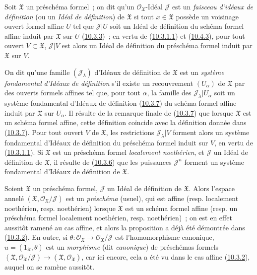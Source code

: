 \begin{env}[10.5.1]
\label{I.10.5.1-fr}
Soit $\mathfrak{X}$ un préschéma formel~; on dit qu'un
$\mathscr{O}_{\mathfrak{X}}$-Idéal $\mathscr{J}$ est un
\emph{faisceau d'idéaux de définition} (ou un
\emph{Idéal de définition}) de $\mathfrak{X}$ si tout
$x\in\mathfrak{X}$ possède un voisinage ouvert formel affine $U$ tel que
$\mathscr{J}|U$ soit un Idéal de définition du schéma formel affine
induit par $\mathfrak{X}$ sur $U$
(\hyperref[I.10.3.3-fr]{10.3.3})~; en vertu de
(\hyperref[I.10.3.1.1-fr]{10.3.1.1}) et
(\hyperref[I.10.4.3-fr]{10.4.3}), pour tout ouvert
$V\subset\mathfrak{X}$, $\mathscr{J}|V$ est alors un Idéal de définition
du préschéma formel induit par $\mathfrak{X}$ sur $V$.

On dit qu'une famille $(\mathscr{J}_\lambda)$ d'Idéaux de définition de
$\mathfrak{X}$ est un \emph{système fondamental}
\emph{d'Idéaux de définition} s'il existe un recouvrement
$(U_\alpha)$ de $\mathfrak{X}$ par des ouverts formels affines tel que,
pour tout $\alpha$, la famille des
$\mathscr{J}_\lambda|U_\alpha$ soit un système fondamental d'Idéaux de
définition (\hyperref[I.10.3.7-fr]{10.3.7}) du schéma formel affine
induit par $\mathfrak{X}$ sur $U_\alpha$. Il résulte de la remarque finale
de (\hyperref[I.10.3.7-fr]{10.3.7}) que lorsque $\mathfrak{X}$ est un
schéma formel affine, cette définition coïncide avec la définition donnée
dans (\hyperref[I.10.3.7-fr]{10.3.7}). Pour tout ouvert $V$ de
$\mathfrak{X}$, les restrictions $\mathscr{J}_\lambda|V$ forment alors un
système fondamental d'Idéaux de définition du préschéma formel induit sur
$V$, en vertu de (\hyperref[I.10.3.1.1-fr]{10.3.1.1}). Si
$\mathfrak{X}$ est un préschéma formel \emph{localement noethérien}, et
$\mathscr{J}$ un Idéal de définition de $\mathfrak{X}$, il résulte de
(\hyperref[I.10.3.6-fr]{10.3.6}) que les puissances $\mathscr{J}^n$
forment un système fondamental d'Idéaux de définition de $\mathfrak{X}$.
\end{env}

\begin{env}[10.5.2]
\label{I.10.5.2-fr}
Soient $\mathfrak{X}$ un préschéma formel, $\mathscr{J}$ un Idéal de
définition de $\mathfrak{X}$. Alors l'espace annelé
$(\mathfrak{X},\mathscr{O}_{\mathfrak{X}}/\mathscr{J})$ est un
\emph{préschéma} (usuel), qui est affine (resp. localement noethérien,
resp. noethérien) lorsque $\mathfrak{X}$ est un schéma formel affine
(resp. un préschéma formel localement noethérien, resp. noethérien)~; on
est en effet aussitôt ramené au cas affine, et alors la proposition a déjà
été démontrée dans (\hyperref[I.10.3.2-fr]{10.3.2}). En outre, si
$\theta:\mathscr{O}_{\mathfrak{X}}\to
\mathscr{O}_{\mathfrak{X}}/\mathscr{J}$ est l'homomorphisme canonique,
$u=(1_{\mathfrak{X}},\theta)$ est un \emph{morphisme} (dit
\emph{canonique}) de préschémas formels
$(\mathfrak{X},\mathscr{O}_{\mathfrak{X}}/\mathscr{J})\to
(\mathfrak{X},\mathscr{O}_{\mathfrak{X}})$, car ici encore, cela a été vu
dans le cas affine (\hyperref[I.10.3.2-fr]{10.3.2}), auquel on se ramène
aussitôt.
\end{env}

